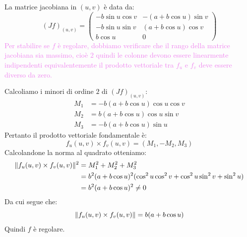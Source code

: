 \begin{esempio}
        La matrice jacobiana in $(u,v)$ è data da:
        \[
        (Jf)_{(u,v)} = \begin{pmatrix}
        -b \sin u \cos v & -(a + b \cos u)\sin v \\
        -b \sin u \sin v & (a + b \cos u)\cos v \\
        b \cos u & 0
        \end{pmatrix}
        \]
        \textcolor{violet}{Per stabilire se $f$ è regolare, dobbiamo verificare che il rango della matrice jacobiana sia massimo, cioè $2$ quindi le 
        colonne devono essere linearmente indipendenti equivalentemente il prodotto vettoriale tra $f_u$ e $f_v$ deve essere diverso da zero.}

        Calcoliamo i minori di ordine $2$ di $(Jf)_{(u,v)}$:
        \begin{align*}
        M_1 &= -b(a + b \cos u)\cos u \cos v \\
        M_2 &= b(a + b \cos u)\cos u \sin v \\
        M_3 &= -b(a + b \cos u)\sin u
        \end{align*}
        Pertanto il prodotto vettoriale fondamentale è:
        \[
        f_u(u,v) \times f_v(u,v) = (M_1, -M_2, M_3)
        \]
        Calcolandone la norma al quadrato otteniamo:
        \begin{align*}
        \lVert f_u(u,v) \times f_v(u,v)\rVert^2 &= M_1^2 + M_2^2 + M_3^2 \\
        &= b^2(a + b \cos u)^2 (\cos^2 u \cos^2 v + \cos^2 u \sin^2 v + \sin^2 u) \\
        &= b^2(a + b \cos u)^2 \neq 0
        \end{align*}
        Da cui segue che:
        \[
        \lVert f_u(u,v) \times f_v(u,v)\rVert = b(a + b \cos u)
        \]
        Quindi $f$ è regolare.


\end{esempio}
